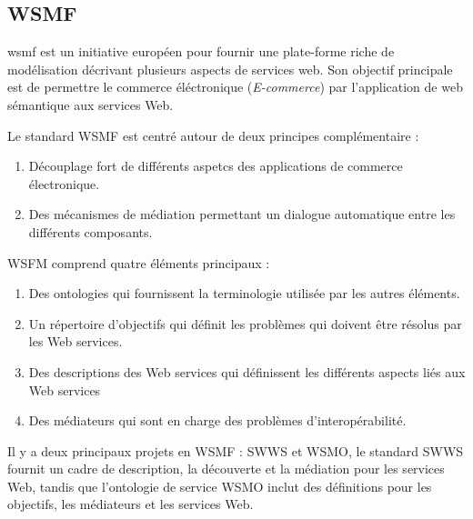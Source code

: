     \subsection{WSMF}
    \label{sec:wsmf}    
    \acrshort{wsmf} \cite{fensel2002web}est un initiative européen
    pour fournir une plate-forme riche de modélisation décrivant
    plusieurs aspects de services web. Son objectif principale est de
    permettre le commerce éléctronique (\emph{E-commerce}) par
    l'application de web sémantique aux services Web.

    Le standard \textsc{WSMF} est centré autour de deux principes
    complémentaire \cite{baryannis2010}:
    
    \begin{enumerate}
    \item Découplage fort de différents aspetcs des applications de
      commerce électronique.

    \item Des mécanismes de médiation permettant un dialogue
      automatique entre les différents composants.
    \end{enumerate}

    WSFM comprend quatre éléments principaux \cite{baryannis2010}:
    \begin{enumerate}
      \item Des ontologies qui fournissent la terminologie utilisée par
        les autres éléments.

      \item Un répertoire d'objectifs qui définit les problèmes qui
        doivent être résolus par les Web services.

      \item Des descriptions des Web services qui définissent les
        différents aspects liés aux Web services

      \item Des médiateurs qui sont en charge des problèmes
        d'interopérabilité.
    \end{enumerate}

    Il y a deux principaux projets en WSMF : \textsc{SWWS} et
    \textsc{WSMO}, le standard \textsc{SWWS} fournit un cadre de
    description, la découverte et la médiation pour les services Web,
    tandis que l'ontologie de service \textsc{WSMO} inclut des
    définitions pour les objectifs, les médiateurs et les services
    Web.

